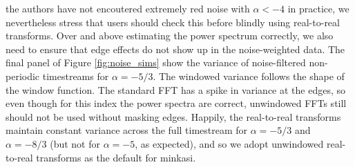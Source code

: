 \documentclass[12]{article}
\begin{document}
the authors have not encoutered extremely red noise with $\alpha<-4$
in practice, we nevertheless stress that users should check this
before blindly using real-to-real transforms.  Over and above
estimating the power spectrum correctly, we also need to ensure that
edge effects do not show up in the noise-weighted data.  The final
panel of Figure \ref{fig:noise_sims} show the variance of
noise-filtered non-periodic timestreams for $\alpha=-5/3$.  The
windowed variance follows the shape of the window function.  The
standard FFT has a spike in variance at the edges, so even though for
this index the power spectra are correct, unwindowed FFTs still should
not be used without masking edges.  Happily, the real-to-real
transforms maintain constant variance across the full timestream for
$\alpha=-5/3$ and $\alpha=-8/3$ (but not for $\alpha=-5$, as
expected), and so we adopt unwindowed real-to-real transforms as the
default for minkasi.
\end{document}
